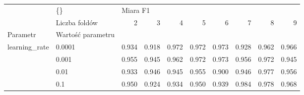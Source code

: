 \begin{tabular}{llrrrrrrrr}
\hline
              & \{\} & \multicolumn{8}{l}{Miara F1} \\
              & Liczba foldów &        2 &      3 &      4 &      5 &      6 &      7 &      8 &      9 \\
Parametr & Wartość parametru &          &        &        &        &        &        &        &        \\
\hline
learning\_rate & 0.0001 &    0.934 &  0.918 &  0.972 &  0.972 &  0.973 &  0.928 &  0.962 &  0.966 \\
              & 0.001 &    0.955 &  0.945 &  0.962 &  0.972 &  0.973 &  0.956 &  0.972 &  0.945 \\
              & 0.01 &    0.933 &  0.946 &  0.945 &  0.955 &  0.900 &  0.946 &  0.977 &  0.956 \\
              & 0.1 &    0.950 &  0.924 &  0.934 &  0.950 &  0.939 &  0.984 &  0.978 &  0.968 \\
\hline
\end{tabular}
